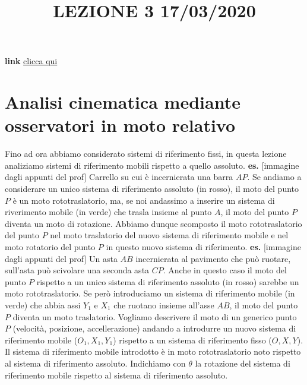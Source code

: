 \title{LEZIONE 3 17/03/2020}\newline
\textbf{link} \href{https://web.microsoftstream.com/video/b53b704d-3613-4728-9d95-917284509b0f}{clicca qui}
\section{Analisi cinematica mediante osservatori in moto relativo}
Fino ad ora abbiamo considerato sistemi di riferimento fissi, in questa lezione analiziamo sistemi di riferimento mobili rispetto a quello assoluto.\newline
\newline
\textbf{es.} [immagine dagli appunti del prof]\newline
Carrello su cui è incernierata una barra $AP$. Se andiamo a considerare un unico sistema di riferimento assoluto (in rosso), il moto del punto $P$ è un moto rototraslatorio, ma, se noi andassimo a inserire un sistema di riverimento mobile (in verde) che trasla insieme al punto $A$, il moto del punto $P$ diventa un moto di rotazione. Abbiamo dunque scomposto il moto rototraslatorio del punto $P$ nel moto traslatorio del nuovo sistema di riferimento mobile e nel moto rotatorio del punto $P$ in questo nuovo sistema di riferimento.\newline
\newline
\textbf{es.} [immagine dagli appunti del prof]\newline
Un asta $AB$ incernierata al pavimento che può ruotare, sull'asta può scivolare una seconda asta $CP$. Anche in questo caso il moto del punto $P$ rispetto a un unico sistema di riferimento assoluto (in rosso) sarebbe un moto rototraslatorio. Se però introduciamo un sistema di riferimento mobile (in verde) che abbia assi $Y_1$ e $X_1$ che ruotano insieme all'asse $AB$, il moto del punto $P$ diventa un moto traslatorio.\newline
{}\newline
Vogliamo descrivere il moto di un generico punto $P$ (velocità, posizione, accellerazione) andando a introdurre un nuovo sistema di riferimento mobile ($O_1, X_1, Y_1$) rispetto a un sistema di riferimento fisso ($O, X, Y$).\newline
Il sistema di riferimento mobile introdotto è in moto rototraslatorio noto rispetto al sistema di riferimento assoluto.\newline
Indichiamo con $\theta$ la rotazione del sistema di riferimento mobile rispetto al sistema di riferimento assoluto.
